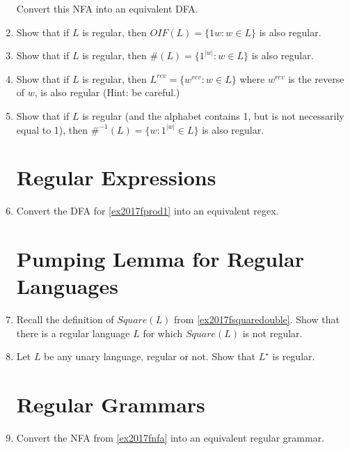\begin{enumerate}
Convert this NFA into an equivalent DFA.

\item {} Show that if $L$ is regular, then $OIF(L) = \{1w : w \in L \}$ is also regular.

\item {} Show that if $L$ is regular, then $\#(L) = \{1^{|w|} : w \in L\}$ is also regular.

\item {} Show that if $L$ is regular, then $L^{rev} = \{w^{rev} : w \in L\}$ where $w^{rev}$ is the reverse of $w$, is also regular (Hint: be careful.)

\item {} Show that if $L$ is regular (and the alphabet contains 1, but is not necessarily equal to 1), then $\#^{-1}(L) = \{w : 1^{|w|} \in L\}$ is also regular.



\section{Regular Expressions}

\item {} Convert the DFA for \cref{ex2017fprod1} into an equivalent regex.

\section{Pumping Lemma for Regular Languages}

\item {} Recall the definition of $Square(L)$ from \cref{ex2017fsquaredouble}. 
Show that there is a regular language $L$ for which $Square(L)$ is not regular.

\item {} Let $L$ be any unary language, regular or not. Show that $L^\star$ is regular.

\section{Regular Grammars}

\item {} Convert the NFA from \cref{ex2017fnfa} into an equivalent regular grammar.

\end{enumerate}